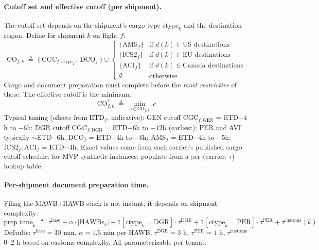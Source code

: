 \documentclass[11pt,a4paper]{article}
\newcommand{\defeq}{\triangleq}
\newcommand{\ctype}{\text{ctype}}
\theoremstyle{definition}
\begin{document}
\paragraph{Cutoff set and effective cutoff (per shipment).}
The cutoff set depends on the shipment's cargo type $\ctype_k$ and the destination region.
Define for shipment $k$ on flight $f$:
\begin{equation}
  \text{CO}_{f,k} \;\defeq\; \{\,\text{CGC}_{f,\ctype_k},\; \text{DCO}_f\,\} \cup
    \begin{cases}
      \{\text{AMS}_f\} & \text{if } d(k) \in \text{US destinations} \\
      \{\text{ICS2}_f\} & \text{if } d(k) \in \text{EU destinations} \\
      \{\text{ACI}_f\} & \text{if } d(k) \in \text{Canada destinations} \\
      \emptyset & \text{otherwise}
    \end{cases}
  \label{eq:cutoff-set}
\end{equation}
Cargo and document preparation must complete before the \emph{most restrictive} of
these. The effective cutoff is the minimum:
\begin{equation}
  \text{CO}_{f,k}^* \;\defeq\; \min_{c \in \text{CO}_{f,k}}\, c
  \label{eq:effective-cutoff}
\end{equation}
Typical timing (offsets from $\text{ETD}_f$, indicative): GEN cutoff $\text{CGC}_{f,\text{GEN}}$
= ETD$-4$h to $-6$h; DGR cutoff $\text{CGC}_{f,\text{DGR}}$ = ETD$-6$h to $-12$h (earliest);
PER and AVI typically $\sim$ETD$-6$h. $\text{DCO}_f$ = ETD$-4$h to $-6$h; $\text{AMS}_f$ =
ETD$-4$h to $-5$h; $\text{ICS2}_f, \text{ACI}_f$ = ETD$-4$h. Exact values come from each
carrier's published cargo cutoff schedule; for MVP synthetic instances, populate from a
per-(carrier, $\tau$) lookup table.

\paragraph{Per-shipment document preparation time.}
Filing the MAWB+HAWB stack is not instant; it depends on shipment complexity:
\begin{equation}
  \text{prep\_time}_k \;\defeq\; \tau^{\text{base}} + \alpha \cdot |\text{HAWBs}_k|
    + \mathbb{1}[\ctype_k = \text{DGR}] \cdot \tau^{\text{DGR}}
    + \mathbb{1}[\ctype_k = \text{PER}] \cdot \tau^{\text{PER}}
    + \tau^{\text{customs}}(k)
  \label{eq:prep-time}
\end{equation}
Defaults: \(\tau^{\text{base}} = 30\) min, \(\alpha = 1.5\) min per HAWB,
\(\tau^{\text{DGR}} = 3\) h, \(\tau^{\text{PER}} = 1\) h, \(\tau^{\text{customs}}\)
0--2 h based on customs complexity. All parameterizable per tenant.
\end{document}
